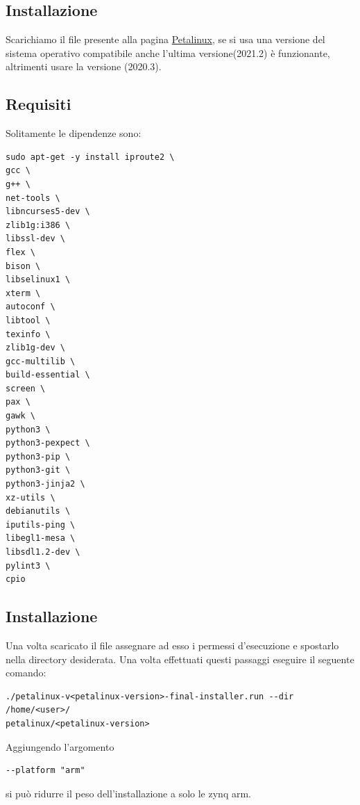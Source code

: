 \subsection{Installazione}
Scarichiamo il file presente alla pagina \href{https://www.xilinx.com/support/download/index.html/content/xilinx/en/downloadNav/embedded-design-tools.html}{Petalinux}, se si usa una versione del sistema operativo compatibile anche l'ultima versione(2021.2) è funzionante, altrimenti usare la versione (2020.3).\\
\subsection{Requisiti}
Solitamente le dipendenze sono:
\begin{lstlisting}
sudo apt-get -y install iproute2 \
gcc \
g++ \
net-tools \
libncurses5-dev \
zlib1g:i386 \
libssl-dev \
flex \
bison \
libselinux1 \
xterm \
autoconf \
libtool \
texinfo \
zlib1g-dev \
gcc-multilib \
build-essential \
screen \
pax \
gawk \
python3 \
python3-pexpect \
python3-pip \
python3-git \
python3-jinja2 \
xz-utils \
debianutils \
iputils-ping \
libegl1-mesa \
libsdl1.2-dev \
pylint3 \
cpio
\end{lstlisting}
\subsection{Installazione}
\label{InstPeta}
Una volta scaricato il file assegnare ad esso i permessi d'esecuzione e spostarlo nella directory desiderata. Una volta effettuati questi passaggi eseguire il seguente comando:
\begin{lstlisting}
./petalinux-v<petalinux-version>-final-installer.run --dir /home/<user>/
petalinux/<petalinux-version>
\end{lstlisting}
Aggiungendo l'argomento 
\begin{lstlisting}
--platform "arm"
\end{lstlisting}
si può ridurre il peso dell'installazione a solo le zynq arm.\\
